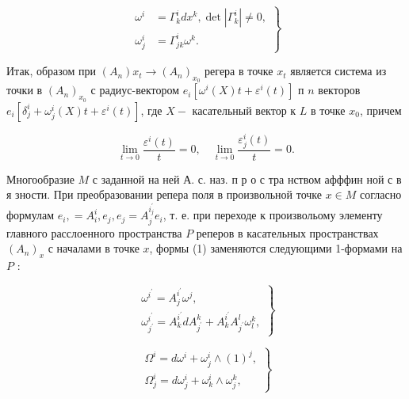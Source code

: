 \documentclass[10pt]{article}
\begin{document}
\[

\left.\begin{array}{rl}

\omega^{i} & =\Gamma_{k}^{i} d x^{k}, \operatorname{det}\left|\Gamma_{k}^{i}\right| \neq 0, \\

\omega_{j}^{i} & =\Gamma_{j k}^{i} \omega^{k} .

\end{array}\right\}

\]



Итак, образом при $\left(A_{n}\right) x_{t} \rightarrow\left(A_{n}\right)_{x_{0}}$ регера в точке $x_{t}$ является система из точки в $\left(A_{n}\right)_{x_{0}}$ с радиус-вектором $e_{i}\left[\omega^{i}(X) t+\varepsilon^{i}(t)\right]$ п $n$ векторов $e_{i}\left[\delta_{j}^{i}+\omega_{j}^{i}(X) t+\varepsilon^{i}(t)\right]$, где $X-$ касательный вектор к $L$ в точке $x_{0}$, причем



\[

\lim _{t \rightarrow 0} \frac{\varepsilon^{i}(t)}{t}=0, \quad \lim _{t \rightarrow 0} \frac{\varepsilon_{j}^{i}(t)}{t}=0 .

\]



Многообразие $M$ с заданной на ней А. с. наз. п р о с тра нством афффин ной с в я зности. При преобразовании репера поля в произвольной точке $x \in M$ согласно формулам $e_{i},=A_{i}^{i}, e_{j}, e_{j}=A_{j}^{i_{j}^{\prime}} e_{i}$, т. е. при переходе к произвольому элементу главного расслоенного пространства $P$ реперов в касательных пространствах $\left(A_{n}\right)_{x}$ с началами в точке $x$, формы (1) заменяются следующими 1-формами на $P$ :



\[

\left.\begin{array}{l}

\omega^{i^{\prime}}=A_{j}^{i^{\prime}} \omega^{j}, \\

\omega_{j^{\prime}}^{i^{\prime}}=A_{k}^{i^{\prime}} d A_{j^{\prime}}^{k}+A_{k}^{i^{\prime}} A_{j^{\prime}}^{l} \omega_{l}^{k},

\end{array}\right\}

\]



\[

\left.\begin{array}{l}

\Omega^{i}=d \omega^{i}+\omega_{j}^{i} \wedge(1)^{j}, \\

\Omega_{j}^{i}=d \omega_{j}^{i}+\omega_{k}^{i} \wedge \omega_{j}^{k},

\end{array}\right\}

\]
\end{document}
